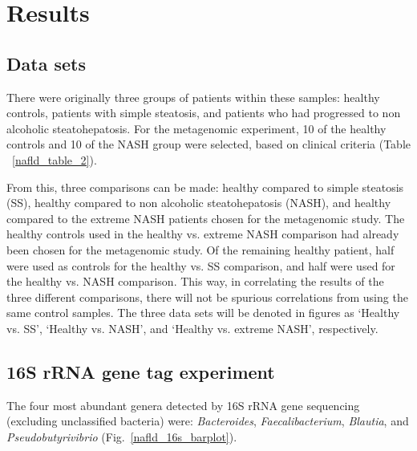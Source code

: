 \FloatBarrier

\section{Results}

\subsection{Data sets}
There were originally three groups of patients within these samples: healthy controls, patients with simple steatosis, and patients who had progressed to non alcoholic steatohepatosis. For the metagenomic experiment, 10 of the healthy controls and 10 of the NASH group were selected, based on clinical criteria (Table ~\ref{nafld_table_2}).

From this, three comparisons can be made: healthy compared to simple steatosis (SS), healthy compared to non alcoholic steatohepatosis (NASH), and healthy compared to the extreme NASH patients chosen for the metagenomic study. The healthy controls used in the healthy vs. extreme NASH comparison had already been chosen for the metagenomic study. Of the remaining healthy patient, half were used as controls for the healthy vs. SS comparison, and half were used for the healthy vs. NASH comparison. This way, in correlating the results of the three different comparisons, there will not be spurious correlations from using the same control samples. The three data sets will be denoted in figures as `Healthy vs. SS', `Healthy vs. NASH', and `Healthy vs. extreme NASH', respectively.

\subsection{16S rRNA gene tag experiment}

The four most abundant genera detected by 16S rRNA gene sequencing (excluding unclassified bacteria) were: \textit{Bacteroides}, \textit{Faecalibacterium}, \textit{Blautia}, and \textit{Pseudobutyrivibrio} (Fig.~\ref{nafld_16s_barplot}).


